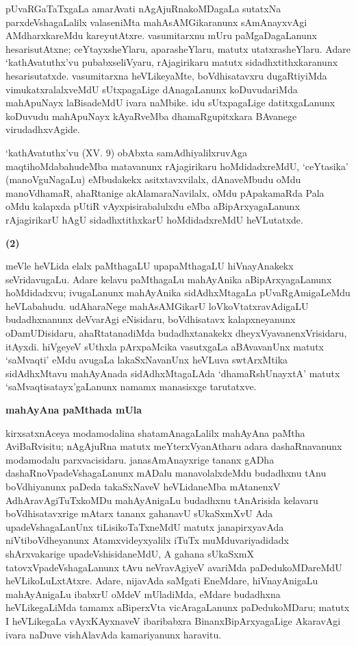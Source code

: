 pUvaRGaTaTxgaLa amarAvati nAgAjuRnakoMDagaLa sutatxNa parxdeVshagaLalilx valase\-niMta mahAsAMGikaranunx sAmAnayxvAgi AMdharxkareMdu kareyutAtxre. vasumitarxnu mUru paMgaDagaLanunx hesarisutAtxne; ceYtayxsheYlaru, aparasheYlaru, matutx utatxrasheYlaru. Adare `kathAvatuthx'vu pubabxseliVyaru, rAjagirikaru matutx sidadhxtithxkaranunx hesarisutatxde. vasumitarxna heVLikeyaMte, boVdhisatavxru dugaRtiyiMda vimukatxralalxveMdU sUtxpa\-gaLige dAnagaLanunx koDuvudariMda mahApuNayx laBisadeMdU ivara naMbike. idu sUtxpagaLige datitxgaLanunx koDuvudu mahApuNayx kAyaRveMba dhamaRgupitxkara BAvanege virudadhxvAgide.

`kathAvatuthx'vu {\rm (XV. 9)} obAbxta samAdhiyalilxruvAga maqtihoMdabahudeMba matavanunx rAjagirikaru hoMdidadxreMdU, `ceYtasika' (manoVguNagaLu) eMbudakekx asitxtavxvilalx, dAnaveMbudu oMdu manoVdhamaR, ahaRtanige akAlamaraNavilalx, oMdu pApakamaRda Pala oMdu kalapxda pUtiR vAyxpisirabalulxdu eMba aBipArxya\-gaLanunx rAjagirikarU hAgU sidadhxtithxkarU hoMdidadxreMdU heVLutatxde.

\begin{center}
{\textbf{\Large (2)}}
\end{center}

meVle heVLida elalx paMthagaLU upapaMthagaLU hiVnayAnakekx seVridavugaLu. Adare kelavu paMthagaLu mahAyAnika aBipArxyagaLanunx hoMdidadxvu; ivugaLanunx mahA\-yAnika sidAdhxMtagaLa pUvaRgAmigaLeMdu heVLabahudu. udAharaNege mahA\-sAMGikarU loVkoVtatxravAdigaLU budadhxnanunx deVvarAgi eNisidaru, boVdhisatavx kalapxneyanunx oDamUDisidaru, ahaRtatanadiMda budadhxtanakekx dheyxVyavanenxVrisidaru, itAyxdi. hiVgeyeV sUthxla pArxpaMcika vasutxgaLa aBAvavanUnx matutx `saMvaqti' eMdu avugaLa lakaSxNavanUnx heVLuva swtArxMtika sidAdhxMtavu mahAyAnada sidAdhxMtagaLAda `dhamaRshUnayxtA' matutx `saMvaqtisatayx'gaLanunx namamx manasisxge tarutatxve.

\begin{center}
{\textbf{\Large mahAyAna paMthada mUla}}
\end{center}

kirxsatxnAceya modamodalina shatamAnagaLalilx mahAyAna paMtha AviBaRvi\-situ; nAgAjuRna matutx meYterxVyanAtharu adara dashaRnavanunx modamodalu parxvacisidaru. janasAmAnayxrige tananx gADha dashaRnoVpadeVshagaLanunx mADalu manavolalxdeMdu budadhxnu tAnu boVdhiyanunx paDeda takaSxNaveV heVLidaneMba mAtanenxV AdhAravAgiTuTxkoMDu mahAyAnigaLu budadhxnu tAnArisida kelavaru boVdhisatavxrige mAtarx tananx gahanavU sUkaSxmXvU Ada upadeVshagaLanUnx tiLisikoTaTxneMdU matutx janapirxyavAda niVtiboVdheyanunx Atamxvideyxyalilx iTuTx muMduvariyadidadx shArxvakarige upadeVshisidaneMdU, A gahana sUkaSxmX tatovxVpadeVshagaLanunx tAvu neVravAgiyeV avariMda paDedukoMDareMdU heVLikoLuLxtAtxre. Adare, nijavAda saMgati EneMdare, hiVnayAnigaLu mahAyAnigaLu ibabxrU oMdeV mUladiMda, eMdare budadhxna heVLikegaLiMda tamamx aBiperxVta vicAragaLanunx paDedukoMDaru; matutx I heVLikegaLa vAyxKAyxnaveV ibaribabxra BinanxBipArxyagaLige AkaravAgi ivara naDuve vishAlavAda kamariyanunx haravitu.

